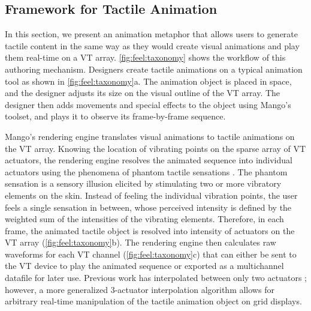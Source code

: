 %
%




\subsection{Framework for Tactile Animation}
%



In this section, we present an animation metaphor that allows users to generate tactile content in the same way as they would create visual animations and play them real-time on a VT array.
\autoref{fig:feel:taxonomy} shows the workflow of this authoring mechanism.  
Designers create tactile animations on a typical animation tool as shown in \autoref{fig:feel:taxonomy}a.
The animation object is placed in space, and the designer adjusts %
its size on the visual outline of the VT array. %
The designer then adds movements and special effects to the object using Mango's toolset,
and plays it to observe its frame-by-frame sequence. %

Mango's rendering engine translates visual animations to tactile animations on the VT array.
Knowing the location of vibrating points on the sparse array of VT actuators, the rendering engine resolves the animated sequence into individual actuators using the phenomena of phantom tactile sensations \cite{Alles1970,Israr2011a}. 
The phantom sensation is a sensory illusion elicited by stimulating two or more vibratory elements on the skin.
Instead of feeling the individual vibration points, the user feels a single sensation in between, whose perceived intensity is defined by the weighted sum of the intensities of the vibrating elements.
Therefore, in each frame, the animated tactile object is resolved into intensity of actuators on the VT array (\autoref{fig:feel:taxonomy}b).
The rendering engine then calculates raw waveforms for each VT channel (\autoref{fig:feel:taxonomy}c) that can either be sent to the VT device to play the animated sequence or exported as a multichannel datafile for later use.
Previous work has interpolated between only two actuators \cite{Seo2013,Lee2012a}; %
however, a more generalized 3-actuator interpolation algorithm allows for arbitrary real-time manipulation of the tactile animation object on grid displays. 

